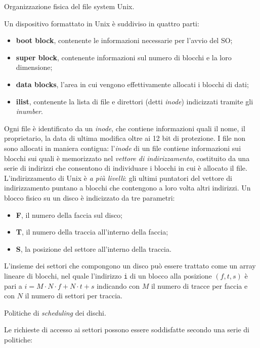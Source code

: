 \documentclass[answers,a4paper,12pt]{exam}
\begin{document}
\begin{questions}
\question
Organizzazione fisica del file system Unix.
\begin{solutionorlines}[3.8in]
		Un dispositivo formattato in Unix è suddiviso in quattro parti:
	\begin{itemize}
		\item \textbf{boot block}, contenente le informazioni necessarie per l'avvio del SO;
		\item \textbf{super block}, contenente informazioni sul numero di blocchi e la loro dimensione;
		\item \textbf{data blocks}, l'area in cui vengono effettivamente allocati i blocchi di dati;
		\item \textbf{ilist}, contenente la lista di file e direttori (detti \textit{inode}) indicizzati tramite gli \textit{inumber}.
	\end{itemize}
Ogni file è identificato da un \textit{inode}, che contiene informazioni quali il nome, il proprietario, la data di ultima modifica oltre ai 12 bit di protezione.
	I file non sono allocati in maniera contigua: l'\textit{inode} di un file contiene informazioni sui blocchi sui quali è memorizzato nel \textit{vettore di indirizzamento}, costituito da una serie di indirizzi che consentono di individuare i blocchi in cui è allocato il file. L'indirizzamento di Unix è \textit{a più livelli}: gli ultimi puntatori del vettore di indirizzamento puntano a blocchi che contengono a loro volta altri indirizzi.
Un blocco fisico su un disco è indicizzato da tre parametri: 
\begin{itemize}
	\item \textbf{F}, il numero della faccia sul disco;
	\item \textbf{T}, il numero della traccia all'interno della faccia;
	\item \textbf{S}, la posizione del settore all'interno della traccia.
\end{itemize}
L'insieme dei settori che compongono un disco può essere trattato come un array lineare di blocchi, nel quale l'indirizzo \texttt{i} di un blocco alla posizione $(f, t, s)$ è pari a $i = M \cdot N \cdot f + N \cdot t + s$ indicando con $M$ il numero di tracce per faccia e con $N$ il numero di settori per traccia.
\end{solutionorlines}
\question
Politiche di \textit{scheduling} dei dischi.
\begin{solutionorlines}[3.8in]
Le richieste di accesso ai settori possono essere soddisfatte secondo una serie di politiche:
\begin{itemize}

\end{itemize}
\end{solutionorlines}
\end{questions}
\end{document}
